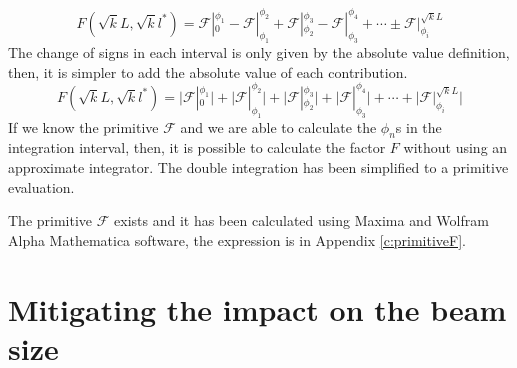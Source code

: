 \begin{equation}
 F(\sqrt{k}L,\sqrt{k}l^*)= \mathscr{F}|_0^{\phi_1} - \mathscr{F}|_{\phi_1}^{\phi_2} +  \mathscr{F}|_{\phi_2}^{\phi_3} - \mathscr{F}|_{\phi_3}^{\phi_4}+ \cdots \pm  \mathscr{F}|_{\phi_i}^{\sqrt{k}L}\label{eq-primeval}
\end{equation}
The change of signs in each interval is only  given by the absolute value definition, then, it is simpler to add the absolute value of each contribution.
\begin{equation}
 F(\sqrt{k}L,\sqrt{k}l^*)= \bigr\vert\mathscr{F}|_0^{\phi_1}\bigr\vert + \bigr\vert\mathscr{F}|_{\phi_1}^{\phi_2}\bigr\vert +  \bigr\vert\mathscr{F}|_{\phi_2}^{\phi_3}\bigr\vert + \bigr\vert\mathscr{F}|_{\phi_3}^{\phi_4}\bigr\vert + \cdots +\bigr\vert\mathscr{F}|_{\phi_i}^{\sqrt{k}L}\bigr\vert
\end{equation}
If we know the primitive $\mathscr{F}$ and we are able to calculate the $\phi_n$s in the integration interval, then, it is possible to calculate the factor $F$ without using an approximate integrator. The double integration has been simplified to a primitive evaluation.\par
The primitive $\mathscr{F}$ exists and it has been calculated using Maxima \cite{Maxima} and Wolfram Alpha Mathematica\cite{Wolfram} software, the expression is in Appendix \ref{c:primitiveF}.\par
  
 
\section{Mitigating the impact on the beam size}
